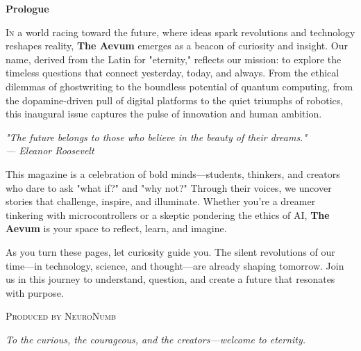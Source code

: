\documentclass[a4paper,10pt,twocolumn]{memoir}
\newenvironment{magquote}
  {\begin{shaded*}\itshape\small}
  {\end{shaded*}}
\begin{document}
\begin{titlingpage}
\thispagestyle{empty}
\begin{center}
\vspace*{1cm}
{\large\bfseries\color{primary}Prologue}
\vspace{0.5cm}
\vspace{0.5cm}
\end{center}
\lettrine[lines=3]{I}{n} a world racing toward the future, where ideas spark revolutions and technology reshapes reality, \textbf{The Aevum} emerges as a beacon of curiosity and insight. Our name, derived from the Latin for "eternity," reflects our mission: to explore the timeless questions that connect yesterday, today, and always. From the ethical dilemmas of ghostwriting to the boundless potential of quantum computing, from the dopamine-driven pull of digital platforms to the quiet triumphs of robotics, this inaugural issue captures the pulse of innovation and human ambition.

\begin{center}
\begin{magquote}
"The future belongs to those who believe in the beauty of their dreams." \\
\hfill --- Eleanor Roosevelt
\end{magquote}
\end{center}
This magazine is a celebration of bold minds---students, thinkers, and creators who dare to ask "what if?" and "why not?" Through their voices, we uncover stories that challenge, inspire, and illuminate. Whether you're a dreamer tinkering with microcontrollers or a skeptic pondering the ethics of AI, \textbf{The Aevum} is your space to reflect, learn, and imagine.

As you turn these pages, let curiosity guide you. The silent revolutions of our time---in technology, science, and thought---are already shaping tomorrow. Join us in this journey to understand, question, and create a future that resonates with purpose.

\vspace{0.3cm}
\begin{flushright}
{\small\scshape\color{gray}Produced by NeuroNumb}
\end{flushright}
\vspace*{\fill}
\begin{center}
   {\large\itshape\color{dark}To the curious, the courageous, and the creators---welcome to eternity.}
\end{center}
\end{titlingpage}
\end{document}

